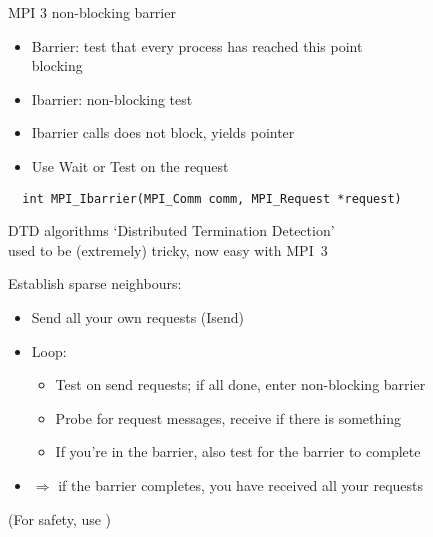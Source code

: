 \begin{frame}[fragile]{MPI 3 non-blocking barrier}
  \begin{itemize}
  \item Barrier: test that every process has reached this point\\
    blocking
  \item Ibarrier: non-blocking test
  \item Ibarrier calls does not block, yields  pointer
  \item Use Wait or Test on the request
  \end{itemize}
\begin{verbatim}
  int MPI_Ibarrier(MPI_Comm comm, MPI_Request *request)
\end{verbatim}
\end{frame}

\begin{frame}[fragile]{DTD algorithms}
  `Distributed Termination Detection'\\
  used to be (extremely) tricky, now easy with MPI~3

  Establish sparse neighbours:
  \begin{itemize}
  \item Send all your own requests (Isend)
  \item Loop:
    \begin{itemize}
    \item Test on send requests; if all done, enter non-blocking barrier
    \item Probe for request messages, receive if there is something
    \item If you're in the barrier, also test for the barrier to complete
    \end{itemize}
  \item $\Rightarrow$ if the barrier completes, you have received all your requests
  \end{itemize}
  (For safety, use )
\end{frame}

